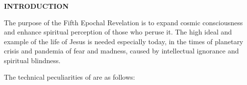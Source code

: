 \newpage
\thispagestyle{empty}

\makeatletter
{}%
\makeatother

\begin{center}
\headingfont\Large{}\bfseries
INTRODUCTION
\end{center}


The purpose of the Fifth Epochal Revelation is to expand cosmic consciousness and enhance spiritual perception of those who
peruse it.
The high ideal and example of the life of Jesus is needed especially today,
in the times of planetary crisis and pandemia of fear and madness, caused by intellectual ignorance and spiritual blindness.

The technical peculiarities of  are as follows:

